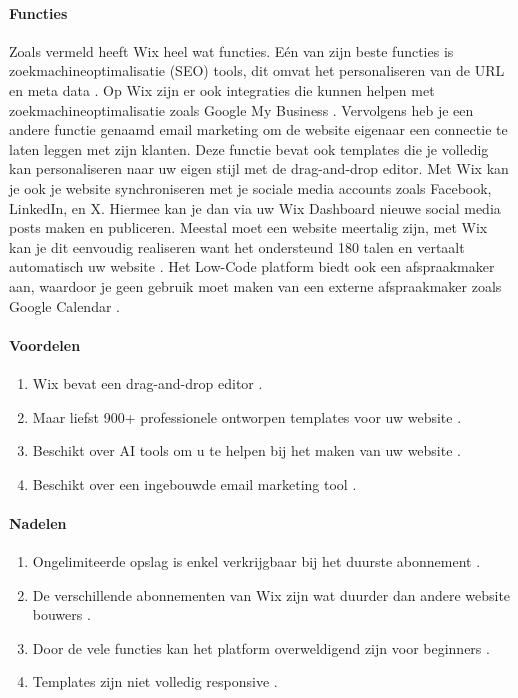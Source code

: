 \paragraph{Functies}
Zoals vermeld heeft Wix heel wat functies. Eén van zijn beste functies is zoekmachineoptimalisatie (SEO) tools, dit omvat het personaliseren van de URL en meta data \autocite{Ryan2024}.
Op Wix zijn er ook integraties die kunnen helpen met zoekmachineoptimalisatie zoals Google My Business \autocite{Ryan2024}. Vervolgens heb je een andere functie genaamd email marketing
om de website eigenaar een connectie te laten leggen met zijn klanten. Deze functie bevat ook templates die je volledig kan personaliseren naar uw eigen stijl met de drag-and-drop editor.
Met Wix kan je ook je website synchroniseren met je sociale media accounts zoals Facebook, LinkedIn, en X. Hiermee kan je dan via uw Wix Dashboard nieuwe social media posts maken en publiceren.
Meestal moet een website meertalig zijn, met Wix kan je dit eenvoudig realiseren want het ondersteund 180 talen en vertaalt automatisch uw website \autocite{Ryan2024}. Het Low-Code platform biedt ook een afspraakmaker aan, waardoor je geen 
gebruik moet maken van een externe afspraakmaker zoals Google Calendar \autocite{Singleton2024}. 
\paragraph*{Voordelen}
\begin{enumerate}
    \item Wix bevat een drag-and-drop editor \autocite{Ryan2024}.
    \item Maar liefst 900+ professionele ontworpen templates voor uw website \autocite{Ryan2024} \autocite{Singleton2024}.
    \item Beschikt over AI tools om u te helpen bij het maken van uw website \autocite{Ryan2024}.
    \item Beschikt over een ingebouwde email marketing tool \autocite{Singleton2024}.
\end{enumerate}


\paragraph*{Nadelen}
\begin{enumerate}
    \item Ongelimiteerde opslag is enkel verkrijgbaar bij het duurste abonnement \autocite{Ryan2024}.
    \item De verschillende abonnementen van Wix zijn wat duurder dan andere website bouwers \autocite{Ryan2024}.
    \item Door de vele functies kan het platform overweldigend zijn voor beginners \autocite{Ryan2024}.
    \item Templates zijn niet volledig responsive \autocite{Singleton2024}.
\end{enumerate}

